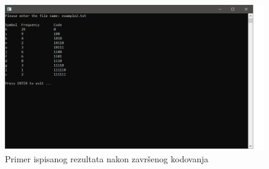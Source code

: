 \documentclass[a4paper, 12pt]{article}
\begin{document}
\begin{figure}[h!]
\centering
\includegraphics[width=.8\textwidth]{done}
\caption{Primer ispisanog rezultata nakon završenog kodovanja}
\label{done}
\end{figure}
\end{document}
